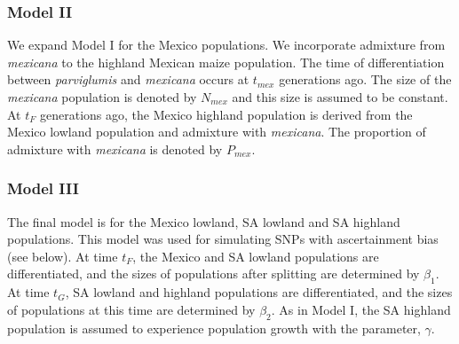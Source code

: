 \subsubsection{Model II}
We expand Model I for the Mexico populations.  We incorporate admixture from \emph{mexicana} to the highland Mexican maize population.  The time of differentiation between \emph{parviglumis} and \emph{mexicana} occurs at $t_{mex}$ generations ago.  The size of the \emph{mexicana} population is denoted by $N_{mex}$ and this size is assumed to be constant.  At $t_F$ generations ago, the Mexico highland population is derived from the Mexico lowland population and admixture with \emph{mexicana}.  The proportion of admixture with \emph{mexicana} is denoted by $P_{mex}$.  \\

\subsubsection{Model III}
The final model is for the Mexico lowland, SA lowland and SA highland populations.  This model was used for simulating SNPs with ascertainment bias (see below).  At time $t_F$, the Mexico and SA lowland populations are differentiated, and the sizes of populations after splitting are determined by $\beta_1$.  At time $t_G$, SA lowland and highland populations are differentiated, and the sizes of populations at this time are determined by $\beta_2$.  As in Model I, the SA highland population is assumed to experience population growth with the parameter, $\gamma$.\\


